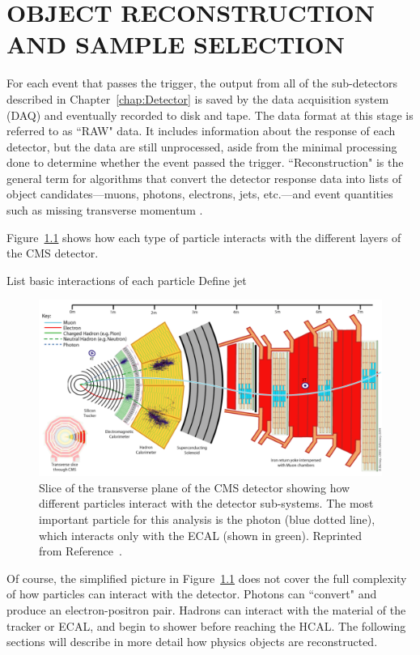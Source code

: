 \chapter{OBJECT RECONSTRUCTION AND SAMPLE SELECTION}
\label{sec:EventReconstruction}

For each event that passes the trigger, the output from all of the sub-detectors described in Chapter~\ref{chap:Detector} is saved by the data acquisition system (DAQ) and eventually recorded to disk and tape. The data format at this stage is referred to as ``RAW" data. It includes information about the response of each detector, but the data are still unprocessed, aside from the minimal processing done to determine whether the event passed the trigger. ``Reconstruction" is the general term for algorithms that convert the detector response data into lists of object candidates---muons, photons, electrons, jets, etc.---and event quantities such as missing transverse momentum \ETmiss.

Figure~\ref{fig:cmsSlice} shows how each type of particle interacts with the different layers of the CMS detector. 

List basic interactions of each particle
Define jet

 \begin{figure}[h!]
	\centering
	\includegraphics[width=\linewidth]{Figures/EventReconstruction/cms_slice.pdf}
       \caption{Slice of the transverse plane of the CMS detector showing how different particles interact with the detector sub-systems. The most important particle for this analysis is the photon (blue dotted line), which interacts only with the ECAL (shown in green).
       Reprinted from Reference~\cite{CDS}.}
       \label{fig:cmsSlice}
\end{figure}

Of course, the simplified picture in Figure~\ref{fig:cmsSlice} does not cover the full complexity of how particles can interact with the detector. Photons can ``convert" and produce an electron-positron pair. Hadrons can interact with the material of the tracker or ECAL, and begin to shower before reaching the HCAL. The following sections will describe in more detail how physics objects are reconstructed. 

